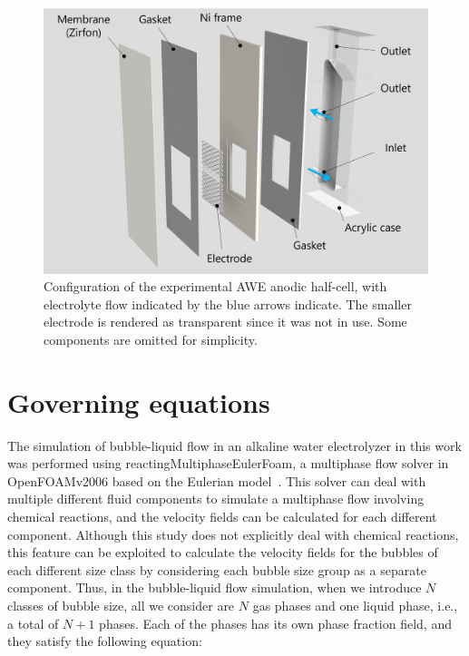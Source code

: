 \documentclass[3p, twocolumn, 10pt]{elsarticle}
\begin{document}
\begin{figure}[h]
  \centering
  \includegraphics[width=1\linewidth]{Untitled.png}
  \caption{Configuration of the experimental AWE anodic half-cell, with electrolyte flow indicated by the blue arrows indicate. The smaller electrode is rendered as transparent since it was not in use. Some components are omitted for simplicity.}
  \label{fig:exp.cell}
\end{figure}

\section{Governing equations}
The simulation of bubble-liquid flow in an alkaline water electrolyzer in this work was performed using reactingMultiphaseEulerFoam, a multiphase flow solver in OpenFOAMv2006 based on the Eulerian model~\cite{OpenFOAMrmef}.
This solver can deal with multiple different fluid components to simulate a multiphase flow involving chemical reactions, and the velocity fields can be calculated for each different component.
Although this study does not explicitly deal with chemical reactions, this feature can be exploited to calculate the velocity fields for the bubbles of each different size class by considering each bubble size group as a separate component.
Thus, in the bubble-liquid flow simulation, when we introduce $N$ classes of bubble size, all we consider are $N$ gas phases and one liquid phase, i.e., a total of $N+1$ phases.
Each of the phases has its own phase fraction field, and they satisfy the following equation:
\end{document}
